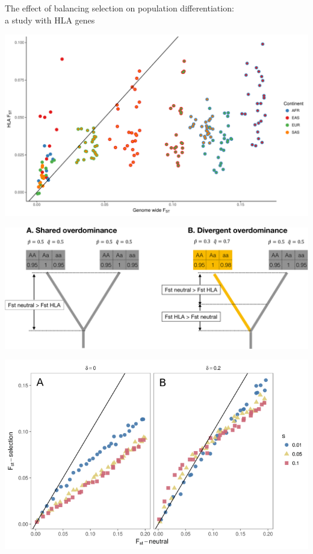 \documentclass[10pt]{beamer}
\begin{document}
\begin{frame}{\small The effect of balancing selection on population
    differentiation:\\ a study with HLA genes}
  \centering
  \begin{minipage}{0.43\textwidth}
    \includegraphics[width=\textwidth]{./Figures/pw_fst.pdf}
  \end{minipage}
  \begin{minipage}{0.43\textwidth}
    \includegraphics[width=\textwidth]{./Figures/fig_od.pdf}
  \end{minipage}
  \begin{minipage}{0.43\textwidth}
    \includegraphics[width=\textwidth]{./Figures/bsel_x_neu_simple_1.png}

\end{minipage}
\end{frame}
\end{document}
